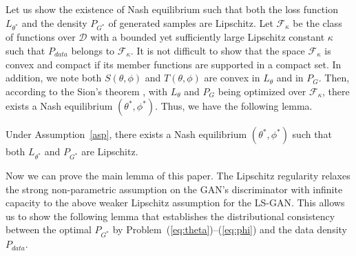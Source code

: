 Let us show the existence of Nash equilibrium
such that both the loss function $L_{\theta^*}$ and the density $P_{G^*}$ of generated samples are Lipschitz. Let $\mathcal F_\kappa$ be the class of functions over $\mathcal D$ with a bounded yet sufficiently large Lipschitz constant $\kappa$ such that $P_{data}$ belongs to $\mathcal F_\kappa$.
It is not difficult to show that the space $\mathcal F_\kappa$ is convex and compact
if its member functions are supported in a compact set.
In addition, we note both $S(\theta,\phi)$ and $T(\theta,\phi)$ are convex in $L_\theta$ and in $P_G$.
Then, according to the Sion's theorem \cite{sion1958general}, with $L_{\theta}$ and $P_{G}$ being optimized over $\mathcal F_\kappa$, there exists a Nash equilibrium $(\theta^*,\phi^*)$.  Thus, we have the following lemma.



\begin{lemma}\label{lem2}
Under Assumption~\ref{asp}, there exists a Nash equilibrium $(\theta^*,\phi^*)$ such that both $L_{\theta^*}$ and $P_{G^*}$ are Lipschitz.
\end{lemma}


Now we can prove the main lemma of this paper. The Lipschitz regularity relaxes the strong non-parametric assumption on the GAN's discriminator with infinite capacity to the above weaker Lipschitz assumption for the LS-GAN. This allows us to show the following lemma that establishes the distributional consistency between the optimal $P_{G^*}$ by Problem~(\ref{eq:theta})--(\ref{eq:phi}) and the data density $P_{data}$.



